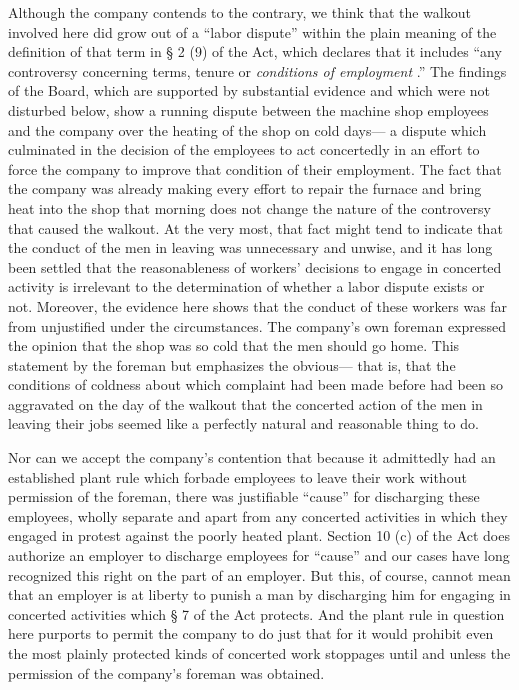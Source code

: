 \documentclass[
  letterpaper,
  11pt,
  DIV=9,
  openright]{scrbook}
\begin{document}
Although the company contends to the contrary, we think that the walkout
involved here did grow out of a ``labor dispute'' within the plain
meaning of the definition of that term in § 2 (9) of the Act, which
declares that it includes ``any controversy concerning terms, tenure or
\emph{conditions of employment} .'' The findings of the Board, which are
supported by substantial evidence and which were not disturbed below,
show a running dispute between the machine shop employees and the
company over the heating of the shop on cold days--- a dispute which
culminated in the decision of the employees to act concertedly in an
effort to force the company to improve that condition of their
employment. The fact that the company was already making every effort to
repair the furnace and bring heat into the shop that morning does not
change the nature of the controversy that caused the walkout. At the
very most, that fact might tend to indicate that the conduct of the men
in leaving was unnecessary and unwise, and it has long been settled that
the reasonableness of workers' decisions to engage in concerted activity
is irrelevant to the determination of whether a labor dispute exists or
not. Moreover, the evidence here shows that the conduct of these workers
was far from unjustified under the circumstances. The company's own
foreman expressed the opinion that the shop was so cold that the men
should go home. This statement by the foreman but emphasizes the
obvious--- that is, that the conditions of coldness about which
complaint had been made before had been so aggravated on the day of the
walkout that the concerted action of the men in leaving their jobs
seemed like a perfectly natural and reasonable thing to do.

Nor can we accept the company's contention that because it admittedly
had an established plant rule which forbade employees to leave their
work without permission of the foreman, there was justifiable ``cause''
for discharging these employees, wholly separate and apart from any
concerted activities in which they engaged in protest against the poorly
heated plant. Section 10 (c) of the Act does authorize an employer to
discharge employees for ``cause'' and our cases have long recognized
this right on the part of an employer. But this, of course, cannot mean
that an employer is at liberty to punish a man by discharging him for
engaging in concerted activities which § 7 of the Act protects. And the
plant rule in question here purports to permit the company to do just
that for it would prohibit even the most plainly protected kinds of
concerted work stoppages until and unless the permission of the
company's foreman was obtained.
\end{document}
